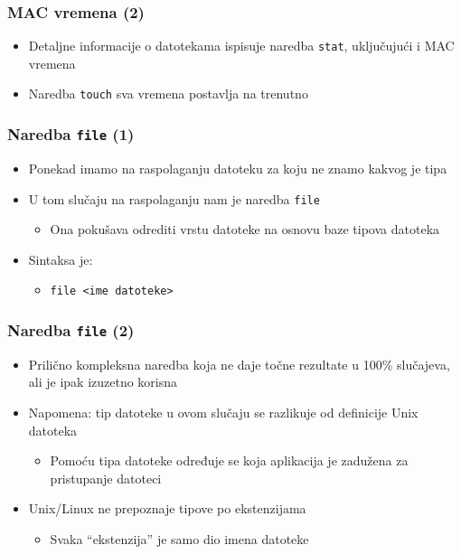 \documentclass{beamer}
\newcommand{\shell}[1]{\texttt{\small #1}}
\begin{document}
\begin{frame}[t]
\frametitle{MAC vremena (2)}
\begin{itemize}
  \item Detaljne informacije o datotekama ispisuje naredba \shell{stat},
        uključujući i MAC vremena
  \item Naredba \shell{touch} sva vremena postavlja na trenutno
\end{itemize}
\end{frame}

\begin{frame}[t]
\frametitle{Naredba \shell{file} (1)}
\begin{itemize}
  \item Ponekad imamo na raspolaganju datoteku za koju ne znamo kakvog je
        tipa
  \item U tom slučaju na raspolaganju nam je naredba \shell{file}
  \begin{itemize}
    \item Ona pokušava odrediti vrstu datoteke na osnovu baze tipova
          datoteka
  \end{itemize}
  \item Sintaksa je:
  \begin{itemize}
    \item[] \shell{file <ime datoteke>}
    \end{itemize}
\end{itemize}
\end{frame}

\begin{frame}[t]
\frametitle{Naredba \shell{file} (2)}
\begin{itemize}
  \item Prilično kompleksna naredba koja ne daje točne rezultate u 100\%
        slučajeva, ali je ipak izuzetno korisna
  \item Napomena: tip datoteke u ovom slučaju se razlikuje od definicije
        Unix datoteka
  \begin{itemize}
    \item Pomoću tipa datoteke određuje se koja aplikacija je zadužena za
          pristupanje datoteci
  \end{itemize}
  \item Unix/Linux ne prepoznaje tipove po ekstenzijama
  \begin{itemize}
    \item Svaka ``ekstenzija'' je samo dio imena datoteke
  \end{itemize}
\end{itemize}
\end{frame}
\end{document}

